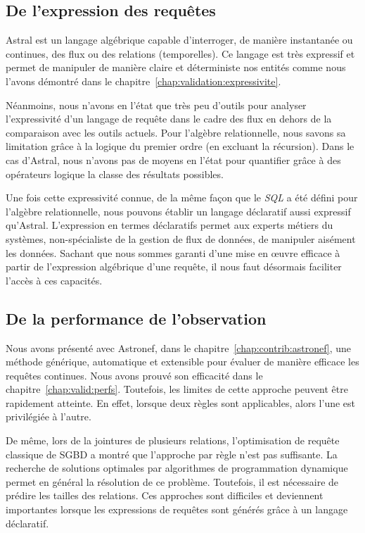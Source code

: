 \subsection{De l'expression des requêtes}
Astral est un langage algébrique capable d'interroger, de manière instantanée ou continues, des flux ou des relations (temporelles). Ce langage est très expressif et permet de manipuler de manière claire et déterministe nos entités comme nous l'avons démontré dans le chapitre~\ref{chap:validation:expressivite}.

Néanmoins, nous n'avons en l'état que très peu d'outils pour analyser l'expressivité d'un langage de requête dans le cadre des flux en dehors de la comparaison avec les outils actuels. Pour l'algèbre relationnelle, nous savons sa limitation grâce à la logique du premier ordre (en excluant la récursion). Dans le cas d'Astral, nous n'avons pas de moyens en l'état pour quantifier grâce à des opérateurs logique la classe des résultats possibles.

Une fois cette expressivité connue, de la même façon que le \textit{SQL} a été défini pour l'algèbre relationnelle, nous pouvons établir un langage déclaratif aussi expressif qu'Astral. L'expression en termes déclaratifs permet aux experts métiers du systèmes, non-spécialiste de la gestion de flux de données, de manipuler aisément les données. Sachant que nous sommes garanti d'une mise en œuvre efficace à partir de l'expression algébrique d'une requête, il nous faut désormais faciliter l'accès à ces capacités.

\subsection{De la performance de l'observation}
Nous avons présenté avec Astronef, dans le chapitre~\ref{chap:contrib:astronef}, une méthode générique, automatique et extensible pour évaluer de manière efficace les requêtes continues. Nous avons prouvé son efficacité dans le chapitre~\ref{chap:valid:perfs}. Toutefois, les limites de cette approche peuvent être rapidement atteinte. En effet, lorsque deux règles sont applicables, alors l'une est privilégiée à l'autre.

De même, lors de la jointures de plusieurs relations, l'optimisation de requête classique de SGBD a montré que l'approche par règle n'est pas suffisante. La recherche de solutions optimales par algorithmes de programmation dynamique permet en général la résolution de ce problème. Toutefois, il est nécessaire de prédire les tailles des relations. Ces approches sont difficiles et deviennent importantes lorsque les expressions de requêtes sont générés grâce à un langage déclaratif.

